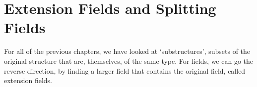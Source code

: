 \chapter{Extension Fields and Splitting Fields}
For all of the previous chapters, we have looked at `substructures', subsets of the original structure that are, themselves, of the same type. For fields, we can go the reverse direction, by finding a larger field that contains the original field, called extension fields.

